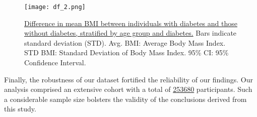 \documentclass[11pt]{article}
\begin{document}
\begin{figure}[htbp]
\centering
\texttt{[image: df\_2.png]}
\caption{\protect\hyperlink{file-df-2-pkl}{Difference in mean BMI between individuals with diabetes and those without diabetes, stratified by age group and diabetes.}
Bars indicate standard deviation (STD). 
Avg. BMI: Average Body Mass Index. 
STD BMI: Standard Deviation of Body Mass Index. 
95\% CI: 95\% Confidence Interval. }
\label{figure:df_2}
\end{figure}
% 
% 
% 
% 

Finally, the robustness of our dataset fortified the reliability of our findings. Our analysis comprised an extensive cohort with a total of \hyperlink{R0a}{253680} participants. Such a considerable sample size bolsters the validity of the conclusions derived from this study.
\end{document}
